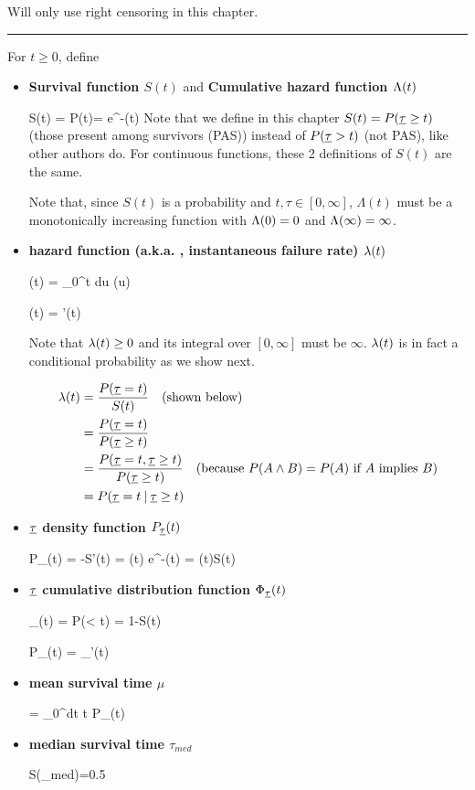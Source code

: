 Will only use right censoring in this chapter.
\hrule
For $t\geq 0$, define
\begin{itemize}
\item {\bf Survival function $S(t)$}
and {\bf Cumulative hazard function $\Lambda(t)$}

\beq
S(t) = P(\rvtau \geq t)= e^{-\Lam(t)}
\eeq
Note that we define in this chapter
 $S(t) = P({\underline{\tau}}\geq t)$ (those present among survivors (PAS))
instead of $P({\underline{\tau}} > t)$ (not PAS), like other authors do. For
continuous functions,
these 2 definitions of $S(t)$
are the same.

Note that,
since $S(t)$
is a probability and $t, \tau \in [0, \infty]$,
$\Lambda(t)$ must be a monotonically increasing function with
$\Lambda(0)=0$ and $\Lambda(\infty) = \infty$.

\item {\bf hazard function
(a.k.a. , instantaneous failure rate) $\lambda(t)$}

\beq
\Lam(t) = \int_0^t  du\; \lam(u)
\eeq

\beq
\lam(t) = \Lam'(t)
\eeq

Note that $\lambda(t)\geq 0$
and its integral over $[0,\infty]$
must be $\infty$.
$\lambda(t)$ is in fact a conditional probability
as we show next.

\begin{align}
\lambda(t) &=
\frac{P({\underline{\tau}}=t)}{S(t)} \quad \text{(shown below)}
\\
&=
\frac{P({\underline{\tau}}=t)}{P({\underline{\tau}}\geq t)}
\\
&=
\frac{P({\underline{\tau}}=t, {\underline{\tau}}\geq t)}{P({\underline{\tau}}\geq t)}
\quad\text{(because $P(A \wedge B) = P(A)$ if $A$ implies $B$)}
\\
&=
P({\underline{\tau}}=t{\:\mathbf{|}\:} {\underline{\tau}}\geq t)
\end{align}


\item {\bf ${\underline{\tau}}$ density function $P_{\underline{\tau}}(t)$}

\beq
P_\rvtau(t) = -S'(t) = \lam(t) e^{-\Lam(t)} =
\lam(t)S(t)
\eeq

\item {\bf ${\underline{\tau}}$ cumulative distribution function
$\Phi_{\underline{\tau}}(t)$}

\beq
\Phi_\rvtau(t) = P(\rvtau< t) = 1-S(t)
\eeq

\beq
P_\rvtau(t) = \Phi_\rvtau'(t)
\eeq

\item {\bf mean survival time $\mu$}

\beq
\mu= \int_0^\infty dt\; t P_\rvtau(t)
\eeq

\item {\bf median survival time $\tau_{med}$}

\beq
S(\tau_{med})=0.5
\eeq

\end{itemize}

